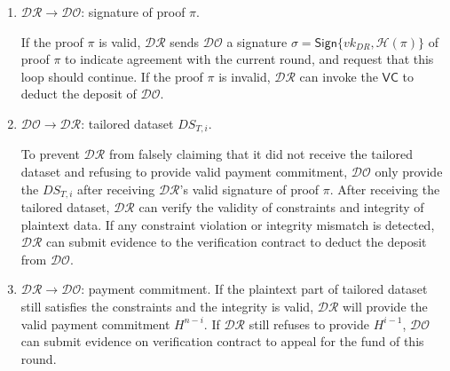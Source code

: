 \documentclass[journal]{IEEEtran}
\begin{document}
\begin{enumerate}
    \item $\mathcal{DR} \rightarrow \mathcal{DO}$: signature of proof $\pi$.

    If the proof $\pi$ is valid, $\mathcal{DR}$ sends $\mathcal{DO}$ a signature $\sigma = \mathsf{Sign}\{vk_{DR}, \mathcal{H}(\pi)\}$ of proof $\pi$ to indicate agreement with the current round, and request that this loop should continue. If the proof $\pi$ is invalid, $\mathcal{DR}$ can invoke the $\mathsf{VC}$ to deduct the deposit of $\mathcal{DO}$.

    \item $\mathcal{DO} \rightarrow \mathcal{DR}$: tailored dataset $DS_{T,i}$.

    To prevent $\mathcal{DR}$ from falsely claiming that it did not receive the tailored dataset and refusing to provide valid payment commitment, $\mathcal{DO}$ only provide the $DS_{T,i}$ after receiving $\mathcal{DR}$'s valid signature of proof $\pi$. After receiving the tailored dataset, $\mathcal{DR}$ can verify the validity of constraints and integrity of plaintext data. If any constraint violation or integrity mismatch is detected, $\mathcal{DR}$ can submit evidence to the verification contract  to deduct the deposit from $\mathcal{DO}$.

    \item $\mathcal{DR} \rightarrow \mathcal{DO}$: payment commitment.
    If the plaintext part of tailored dataset still satisfies the constraints and the integrity is valid, $\mathcal{DR}$ will provide the valid payment commitment $H^{n-i}$. If $\mathcal{DR}$ still refuses to provide $H^{i-1}$, $\mathcal{DO}$ can submit evidence on verification contract to appeal for the fund of this round. 
\end{enumerate}
\end{document}
